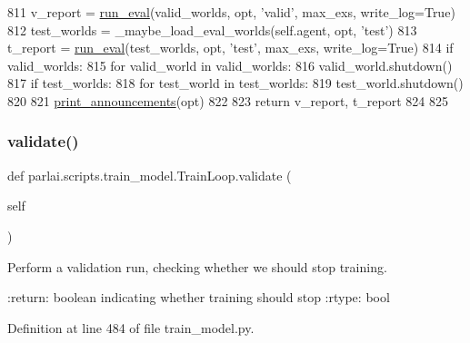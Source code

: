 \begin{DoxyCode}
811         v\_report = \hyperlink{namespaceparlai_1_1scripts_1_1train__model_a496dfe3bf04da9b55d261b4c8d6229a7}{run\_eval}(valid\_worlds, opt, \textcolor{stringliteral}{'valid'}, max\_exs, write\_log=\textcolor{keyword}{True})
812         test\_worlds = \_maybe\_load\_eval\_worlds(self.agent, opt, \textcolor{stringliteral}{'test'})
813         t\_report = \hyperlink{namespaceparlai_1_1scripts_1_1train__model_a496dfe3bf04da9b55d261b4c8d6229a7}{run\_eval}(test\_worlds, opt, \textcolor{stringliteral}{'test'}, max\_exs, write\_log=\textcolor{keyword}{True})
814         \textcolor{keywordflow}{if} valid\_worlds:
815             \textcolor{keywordflow}{for} valid\_world \textcolor{keywordflow}{in} valid\_worlds:
816                 valid\_world.shutdown()
817         \textcolor{keywordflow}{if} test\_worlds:
818             \textcolor{keywordflow}{for} test\_world \textcolor{keywordflow}{in} test\_worlds:
819                 test\_world.shutdown()
820 
821         \hyperlink{namespaceparlai_1_1core_1_1params_afd1a47c94990168ea9e70d894a79bd2c}{print\_announcements}(opt)
822 
823         \textcolor{keywordflow}{return} v\_report, t\_report
824 
825 
\end{DoxyCode}
\mbox{\label{classparlai_1_1scripts_1_1train__model_1_1TrainLoop_a707bb03792ef7427f5ddbb66184a9756}} 
\subsubsection{\texorpdfstring{validate()}{validate()}}
{\footnotesize\ttfamily def parlai.\+scripts.\+train\+\_\+model.\+Train\+Loop.\+validate (\begin{DoxyParamCaption}\item[{}]{self }\end{DoxyParamCaption})}

\begin{DoxyVerb}Perform a validation run, checking whether we should stop training.

:return: boolean indicating whether training should stop
:rtype: bool
\end{DoxyVerb}
 

Definition at line 484 of file train\+\_\+model.\+py.


